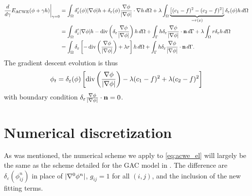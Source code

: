 \begin{align*}
\frac{d}{d\gamma}E_\textrm{ACWE}(\phi + \gamma h) \bigg\rvert_{\gamma = 0}
&= \int_{\Omega} \delta'_\varepsilon(\phi) \lvert\nabla \phi\rvert h + \delta_\varepsilon(\phi) \frac{\nabla \phi}{\lvert\nabla \phi\rvert} \cdot \nabla h \,d\Omega
+ \lambda\int_{\Omega} \underbrace{\left[(c_1 - f)^2 - (c_2 - f)^2 \right]}_{=r(x)} \delta_\varepsilon(\phi) h \,d\Omega 
\\
&= \int_{\Omega } \delta'_\varepsilon \lvert\nabla \phi\rvert h
- \operatorname{div}\left(\delta_\varepsilon\frac{\nabla \phi}{\lvert\nabla \phi\rvert}  \right)  h
\,d\Omega 
+ \int_\Gamma h\delta_\varepsilon\frac{\nabla \phi}{\lvert\nabla \phi\rvert} \cdot \mathbf{n} \,d\Gamma 
+ \lambda\int_{\Omega} r \delta_\varepsilon h \,d\Omega
\\
&= \int_{\Omega} \delta_\varepsilon\left[ 
- \operatorname{div}\left(\frac{\nabla \phi}{\lvert\nabla \phi\rvert} \right) + \lambda r
\right] h\,d\Omega 
+ \int_\Gamma h\delta_\varepsilon\frac{\nabla \phi}{\lvert\nabla \phi\rvert} \cdot \mathbf{n} \,d\Gamma. 
\end{align*}
The gradient descent evolution is thus 
\begin{align}
\phi_t 
= \delta_\varepsilon(\phi) \left[ 
\operatorname{div}\left(\frac{\nabla \phi}{\lvert\nabla \phi\rvert} \right) - \lambda (c_1 - f)^2 + \lambda (c_2 - f)^2 
\right]
\label{eq:acwe_el}
\end{align}
with boundary condition $\delta_\varepsilon 
\frac{\nabla \phi}{\lvert\nabla \phi\rvert} \cdot \mathbf{n} = 0$.


\section{Numerical discretization}
As was mentioned, the numerical scheme we apply to \eqref{eq:acwe_el} will largely be the same as the scheme detailed for the GAC model in . The difference are $\delta_\varepsilon(\phi^n_{ij})$ in place of $\lvert\nabla^0 \phi^n\rvert$, $g_{ij} = 1$ for all $(i,j)$, and the inclusion of the new fitting terms.

